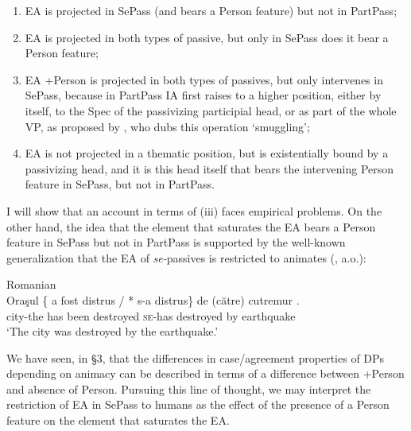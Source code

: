 \documentclass[output=paper]{langsci/langscibook}
\begin{document}
\begin{enumerate}[label=(\roman*)]
\item EA is projected in SePass (and bears a Person feature) but not in PartPass; 
\item EA is projected in both types of passive, but only in SePass does it bear a Person feature;
\item EA +Person is projected in both types of passives, but only intervenes in SePass, because in PartPass IA first raises to a higher position, either by itself, to the Spec of the passivizing participial head, or as part of the whole VP, as proposed by \citet{Collins2005}, who dubs this operation ‘smuggling’; 
\item EA is not projected in a thematic position, but is existentially bound by a passivizing head, and it is this head itself that bears the intervening Person feature in SePass, but not in PartPass.
\end{enumerate} 


  I will show that an account in terms of (iii) faces empirical problems. On the other hand, the idea that the element that saturates the EA bears a Person feature in SePass but not in PartPass is supported by the well-known generalization that the EA of \textit{se-}passives is restricted to animates (\citealt{Burzio1994,Cornilescu1998,Dobrovie-Sorin2017,Zribi-Hertz2008}, a.o.):

\ea%
         Romanian   \label{ex:giurgea:28}\\
    \gll Oraşul \{ a    fost  distrus      / * s-a      distrus\}   de (către) cutremur  .\\
         city-the  has been destroyed    \textsc{se-}has destroyed by            earthquake\\
    \glt ‘The city was destroyed by the earthquake.’
    \z

          

We have seen, in §3, that the differences in case/agreement properties of DPs depending on animacy can be described in terms of a difference between +Person and absence of Person. Pursuing this line of thought, we may interpret the restriction of EA in SePass to humans as the effect of the presence of a Person feature on the element that saturates the EA.
\end{document}
